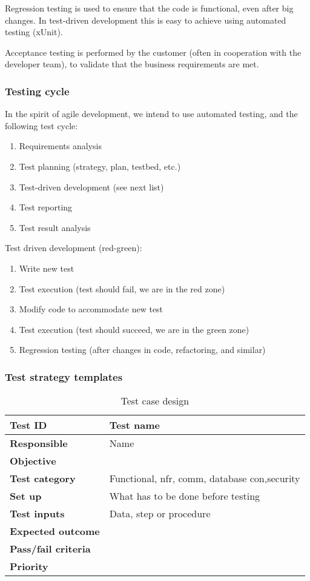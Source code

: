 Regression testing is used to ensure that the code is functional, even after big
changes. In test-driven development this is easy to achieve using automated
testing (xUnit).

Acceptance testing is performed by the customer (often in cooperation with the
developer team), to validate that the business requirements are met.

\subsubsection{Testing cycle}

In the spirit of agile development, we intend to use automated testing, and the
following test cycle:

\begin{enumerate}
	\item Requirements analysis
	\item Test planning (strategy, plan, testbed, etc.)
	\item Test-driven development (see next list)
	\item Test reporting
	\item Test result analysis
\end{enumerate}

Test driven development (red-green):
\begin{enumerate}
	\item Write new test
	\item Test execution (test should fail, we are in the red zone)
	\item Modify code to accommodate new test
	\item Test execution (test should succeed, we are in the green zone)
	\item Regression testing (after changes in code, refactoring, and similar)
\end{enumerate}

\subsubsection{Test strategy templates}

\begin{table}[htb]
	\centering
    \begin{tabular}{| l | l |}
		\hline
		\textbf{Test ID} & Test name \\ \hline
		\textbf{Responsible} & Name \\ \hline
		\textbf{Objective} &  \\ \hline
		\textbf{Test category} & Functional, nfr, comm, database con,security \\ \hline
		\textbf{Set up} & What has to be done before testing \\ \hline
		\textbf{Test inputs} & Data, step or procedure \\ \hline
		\textbf{Expected outcome} & \\ \hline
		\textbf{Pass/fail criteria} & \\ \hline
		\textbf{Priority} & \\ \hline
    \end{tabular}
  \caption{Test case design}
\end{table}

